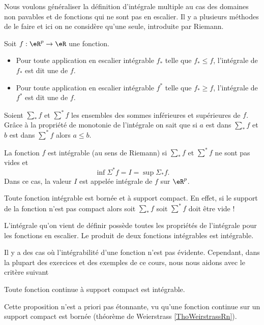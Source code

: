 Nous voulons généraliser la définition d'intégrale multiple au cas des domaines non pavables et de fonctions qui ne sont pas en escalier. Il y a plusieurs méthodes de le faire et ici on ne considère qu'une seule, introduite par Riemann.  
\begin{definition} Soit $f: \eR^p\to \eR$ une fonction.
  \begin{itemize}
	  \item Pour toute application en escalier intégrable $f_*$ telle que $f_*\leq f$, l'intégrale de $f_*$ est dit une  de $f$. 
	  \item Pour toute application en escalier intégrable $f^*$ telle que $f_*\geq f$, l'intégrale de $f^*$ est dit une  de $f$. 
  \end{itemize}
\end{definition}
Soient $\sum_* f$ et  $\sum^* f$ les ensembles des sommes inférieures et supérieures de $f$. Grâce à la propriété de  monotonie de l'intégrale on sait que si $a$ est dans $\sum_* f$ et  $b$ est dans $\sum^* f$ alors $a\leq b$. 
\begin{definition}
  La fonction $f$ est intégrable (au sens de Riemann) si $\sum_* f$ et  $\sum^* f$ ne sont pas vides et 
\[
\inf \Sigma^* f=I =\sup \Sigma_* f.
\] 
Dans ce cas, la valeur $I$ est appelée intégrale de $f$ sur $\eR^p$. 
\end{definition}
\begin{remark}
  Toute fonction intégrable est bornée et à support compact. En effet, si le support de la  fonction n'est pas compact alors soit $\sum_* f$ soit $\sum^* f$ doit être vide ! 
\end{remark}
L'intégrale qu'on vient de définir possède toutes les propriétés de l'intégrale pour les fonctions en escalier. Le produit de deux fonctions intégrables est intégrable. 

Il y a des cas où l'intégrabilité d'une fonction n'est pas évidente. Cependant, dans la plupart des exercices et des exemples de ce cours, nous nous aidons avec le critère suivant 
\begin{proposition}
  Toute fonction continue à support compact est intégrable. 
\end{proposition}
Cette proposition n'est a priori pas étonnante, vu qu'une fonction continue sur un support compact est bornée (théorème de Weierstrass \ref{ThoWeirstrassRn}).

